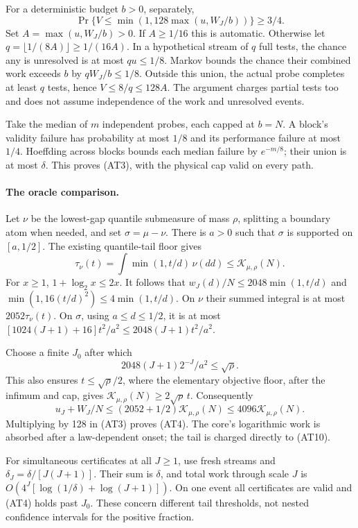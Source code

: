 For a deterministic budget $b>0$, separately,
\[
 \Pr\{V\le\min(1,128\max(u,W_J/b))\}\ge3/4.
 \tag{AT9}
\]
Set $A=\max(u,W_J/b)>0$. If $A\ge1/16$ this is automatic. Otherwise let
$q=\lfloor1/(8A)\rfloor\ge1/(16A)$. In a hypothetical stream of $q$ full
tests, the chance any is unresolved is at most $qu\le1/8$. Markov bounds the
chance their combined work exceeds $b$ by $qW_J/b\le1/8$. Outside this union,
the actual probe completes at least $q$ tests, hence $V\le8/q\le128A$.
The argument charges partial tests too and does not assume independence of
the work and unresolved events.

Take the median of $m$ independent probes, each capped at $b=N$. A block's
validity failure has probability at most $1/8$ and its performance failure
at most $1/4$. Hoeffding across blocks bounds each median failure by
$e^{-m/8}$; their union is at most $\delta$. This proves (AT3), with the
physical cap valid on every path.

\paragraph{The oracle comparison.}
Let $\nu$ be the lowest-gap quantile submeasure of mass $\rho$, splitting a
boundary atom when needed, and set $\sigma=\mu-\nu$. There is $a>0$ such
that $\sigma$ is supported on $[a,1/2]$. The existing quantile-tail floor gives
\[
 \tau_\nu(t)=\int\min(1,t/d)\,\nu(dd)\le\mathcal K_{\mu,\rho}(N).
 \tag{AT10}
\]
For $x\ge1$, $1+\log_2x\le2x$. It follows that $w_J(d)/N\le2048\min(1,t/d)$
and $\min(1,16(t/d)^2)\le4\min(1,t/d)$. On $\nu$ their summed integral is
at most $2052\tau_\nu(t)$. On $\sigma$, using $a\le d\le1/2$, it is at most
$[1024(J+1)+16]t^2/a^2\le2048(J+1)t^2/a^2$.

Choose a finite $J_0$ after which
\[
 2048(J+1)2^{-J}/a^2\le\sqrt\rho.
 \tag{AT11}
\]
This also ensures $t\le\sqrt\rho/2$, where the elementary objective floor,
after the infimum and cap, gives $\mathcal K_{\mu,\rho}(N)\ge2\sqrt\rho\,t$.
Consequently
\[
 u_J+W_J/N\le(2052+1/2)\mathcal K_{\mu,\rho}(N)
 \le4096\mathcal K_{\mu,\rho}(N).
 \tag{AT12}
\]
Multiplying by 128 in (AT3) proves (AT4). The core's logarithmic work is
absorbed after a law-dependent onset; the tail is charged directly to (AT10).

For simultaneous certificates at all $J\ge1$, use fresh streams and
$\delta_J=\delta/[J(J+1)]$. Their sum is $\delta$, and total work through
scale $J$ is $O(4^J[\log(1/\delta)+\log(J+1)])$. On one event all certificates
are valid and (AT4) holds past $J_0$. These concern different tail thresholds,
not nested confidence intervals for the positive fraction.

